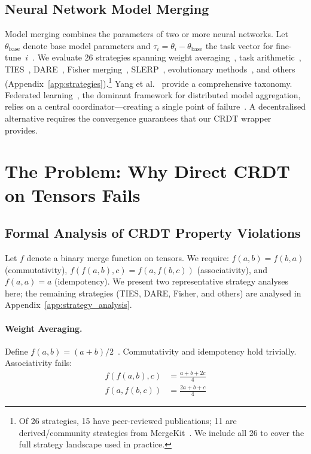 \documentclass[10pt,letterpaper]{article}
\begin{document}
\subsection{Neural Network Model Merging}

Model merging combines the parameters of two or more neural networks.
Let $\theta_{\mathrm{base}}$ denote base model parameters and $\tau_i = \theta_i - \theta_{\mathrm{base}}$ the task vector for fine-tune~$i$~\cite{ilharco2023editing}.
We evaluate 26 strategies spanning weight averaging~\cite{wortsman2022model}, task arithmetic~\cite{ilharco2023editing}, TIES~\cite{yadav2023ties}, DARE~\cite{yu2024dare}, Fisher merging~\cite{matena2022merging}, SLERP~\cite{shoemake1985animating}, evolutionary methods~\cite{akiba2025evolutionary}, and others (Appendix~\ref{app:strategies}).\footnote{\label{fn:provenance}Of 26 strategies, 15 have peer-reviewed publications; 11 are derived/community strategies from MergeKit~\cite{goddard2024mergekit}.  We include all 26 to cover the full strategy landscape used in practice.}
Yang et al.~\cite{yang2024survey} provide a comprehensive taxonomy.
Federated learning~\cite{mcmahan2017communication, kairouz2021advances}, the dominant framework for distributed model aggregation, relies on a central coordinator---creating a single point of failure~\cite{bonawitz2019towards}.
A decentralised alternative requires the convergence guarantees that our CRDT wrapper provides.

\section{The Problem: Why Direct CRDT on Tensors Fails}\label{sec:problem}

\subsection{Formal Analysis of CRDT Property Violations}

Let $f$ denote a binary merge function on tensors.
We require: $f(a,b)=f(b,a)$ (commutativity), $f(f(a,b),c)=f(a,f(b,c))$ (associativity), and $f(a,a)=a$ (idempotency).
We present two representative strategy analyses here; the remaining strategies (TIES, DARE, Fisher, and others) are analysed in Appendix~\ref{app:strategy_analysis}.

\paragraph{Weight Averaging.}
Define $f(a,b)=(a+b)/2$~\cite{wortsman2022model}.
Commutativity and idempotency hold trivially.
Associativity fails:
\begin{align}
f(f(a,b),c) &= \frac{a+b+2c}{4} \label{eq:avg_left}\\
f(a,f(b,c)) &= \frac{2a+b+c}{4} \label{eq:avg_right}
\end{align}
\end{document}
